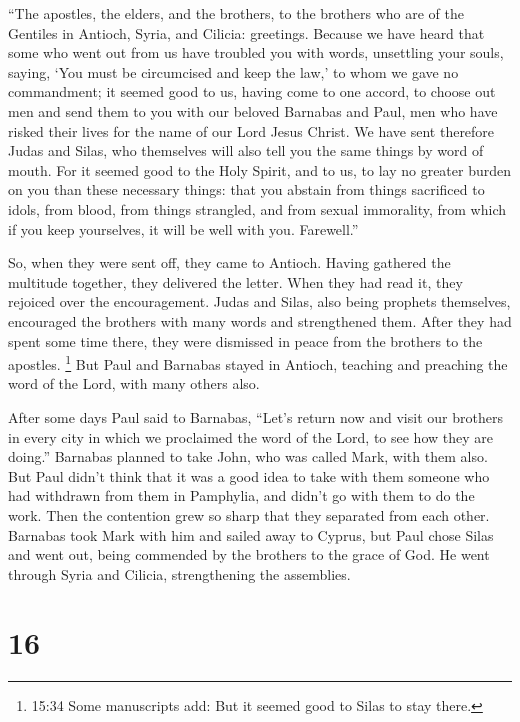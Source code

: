 ``The apostles, the elders, and the brothers, to the brothers who are of
the Gentiles in Antioch, Syria, and Cilicia: greetings. 
Because we have heard that some who went out from us have troubled you
with words, unsettling your souls, saying, `You must be circumcised and
keep the law,' to whom we gave no commandment;  it seemed
good to us, having come to one accord, to choose out men and send them
to you with our beloved Barnabas and Paul,  men who have
risked their lives for the name of our Lord Jesus Christ. 
We have sent therefore Judas and Silas, who themselves will also tell
you the same things by word of mouth.  For it seemed good
to the Holy Spirit, and to us, to lay no greater burden on you than
these necessary things:  that you abstain from things
sacrificed to idols, from blood, from things strangled, and from sexual
immorality, from which if you keep yourselves, it will be well with you.
Farewell.''

 So, when they were sent off, they came to Antioch. Having
gathered the multitude together, they delivered the letter.
 When they had read it, they rejoiced over the
encouragement.  Judas and Silas, also being prophets
themselves, encouraged the brothers with many words and strengthened
them.  After they had spent some time there, they were
dismissed in peace from the brothers to the apostles. 
\footnote{15:34 Some manuscripts add: But it seemed good to Silas to
  stay there.}  But Paul and Barnabas stayed in Antioch,
teaching and preaching the word of the Lord, with many others also.

 After some days Paul said to Barnabas, ``Let's return now
and visit our brothers in every city in which we proclaimed the word of
the Lord, to see how they are doing.''  Barnabas planned to
take John, who was called Mark, with them also.  But Paul
didn't think that it was a good idea to take with them someone who had
withdrawn from them in Pamphylia, and didn't go with them to do the
work.  Then the contention grew so sharp that they
separated from each other. Barnabas took Mark with him and sailed away
to Cyprus,  but Paul chose Silas and went out, being
commended by the brothers to the grace of God.  He went
through Syria and Cilicia, strengthening the assemblies.

\hypertarget{section-15}{%
\section{16}\label{section-15}}

